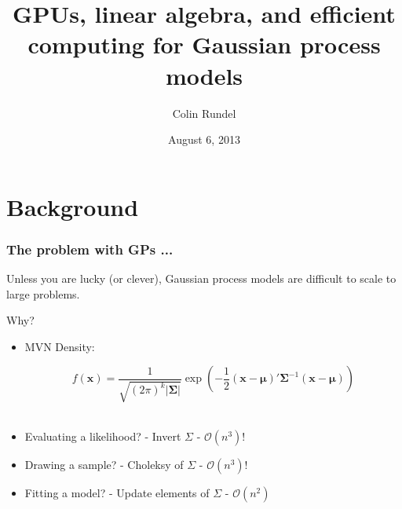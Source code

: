 \documentclass[slidestop,mathserif]{beamer}
\title[JSM 2013]{GPUs, linear algebra, and efficient computing for Gaussian process models}
\author{Colin Rundel}
\date{August 6, 2013}
\institute[Duke]{Duke University}
\begin{document}
\begin{frame}[plain]
\titlepage
\end{frame}


\section{Background}
\addtocounter{framenumber}{-1} 


\begin{frame}
\frametitle{The problem with GPs ...}

Unless you are lucky (or clever), Gaussian process models are difficult to scale to large problems.

\pause
\vspace{7mm}

Why?
\vspace{4mm}
\begin{itemize}
\pause \item MVN Density:

\[
  f(\bm{x}) = \frac{1}{\sqrt{(2\pi)^k|\bm{\Sigma}|}}  \exp\left(-\frac{1}{2} (\bm{x}-\bm{\mu})' \bm{\Sigma}^{-1} (\bm{x}-\bm{\mu}) \right)
\]
~\\

\pause \item Evaluating a likelihood? \pause - Invert $\Sigma$ \pause - $\mathcal{O}\left(n^3\right)$!
\vspace{2mm}
\pause \item Drawing a sample? \pause - Choleksy of $\Sigma$ \pause - $\mathcal{O}\left(n^3\right)!$
\vspace{2mm}
\pause \item Fitting a model? \pause - Update elements of $\Sigma$ \pause - $\mathcal{O}\left(n^2\right)$
\end{itemize}

\end{frame}

\end{document}
